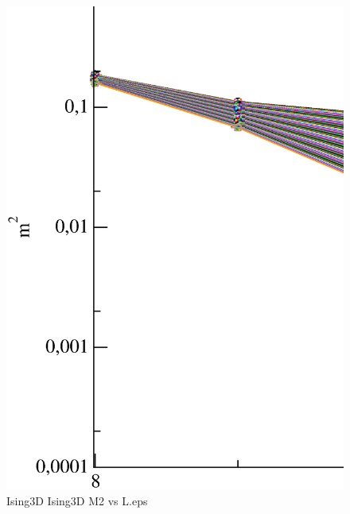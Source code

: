 \begin{figure}[!htpb]
  \centering
  \includegraphics[width=\textwidth]{./plots/Ising3D/Ising3D_M2_vs_L.eps}
  \caption{Ising3D Ising3D M2 vs L.eps}
\end{figure}

